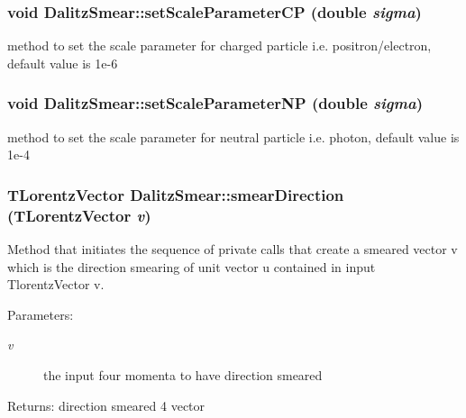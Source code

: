 \subsubsection{\setlength{\rightskip}{0pt plus 5cm}void Dalitz\-Smear::set\-Scale\-Parameter\-CP (double {\em sigma})}\label{classDalitzSmear_811167aba8628dd4812c3f8658bee112}


method to set the scale parameter for charged particle i.e. positron/electron, default value is 1e-6 

\subsubsection{\setlength{\rightskip}{0pt plus 5cm}void Dalitz\-Smear::set\-Scale\-Parameter\-NP (double {\em sigma})}\label{classDalitzSmear_1713a1dab553950ee81262bec7affa0d}


method to set the scale parameter for neutral particle i.e. photon, default value is 1e-4 

\subsubsection{\setlength{\rightskip}{0pt plus 5cm}TLorentz\-Vector Dalitz\-Smear::smear\-Direction (TLorentz\-Vector {\em v})}\label{classDalitzSmear_581c50a4d6c7694f1d59294e09a9201d}


Method that initiates the sequence of private calls that create a smeared vector v which is the direction smearing of unit vector u contained in input Tlorentz\-Vector v. 

\begin{Desc}
\item[Parameters:]
\begin{description}
\item[{\em v}]the input four momenta to have direction smeared \end{description}
\end{Desc}
\begin{Desc}
\item[Returns:]direction smeared 4 vector \end{Desc}
